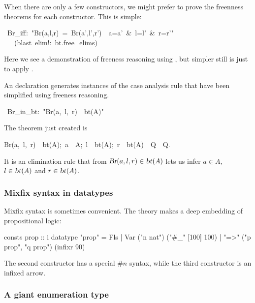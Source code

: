 When there are only a few constructors, we might prefer to prove the freenness
theorems for each constructor.  This is simple:
\begin{isabelle}
\ Br\_iff:\ "Br(a,l,r)\ =\ Br(a',l',r')\ <->\ a=a'\ \&\ l=l'\ \&\ r=r'"\isanewline
\ \ \ (blast\ elim!:\ bt.free\_elims)
\end{isabelle}
Here we see a demonstration of freeness reasoning using
, but simpler still is just to apply .

An  declaration generates instances of the
case analysis rule that have been simplified  using freeness
reasoning. 
\begin{isabelle}
\ Br\_in\_bt:\ "Br(a,\ l,\ r)\ \isasymin \ bt(A)"
\end{isabelle}
The theorem just created is 
\begin{isabelle}
\isasymlbrakk Br(a,\ l,\ r)\ \isasymin \ bt(A);\ \isasymlbrakk a\ \isasymin \ A;\ l\ \isasymin \ bt(A);\ r\ \isasymin \ bt(A)\isasymrbrakk \ \isasymLongrightarrow \ Q\isasymrbrakk \ \isasymLongrightarrow \ Q.
\end{isabelle}
It is an elimination rule that from $\emph{\sl Br}(a,l,r)\in\emph{\sl bt}(A)$
lets us infer $a\in A$, $l\in\emph{\sl bt}(A)$ and
$r\in\emph{\sl bt}(A)$.


\subsubsection{Mixfix syntax in datatypes}

Mixfix syntax is sometimes convenient.  The theory  makes a
deep embedding of propositional logic:
\begin{alltt*}\isastyleminor
consts     prop :: i
datatype  "prop" = Fls
                 | Var ("n \isasymin nat")                ("#_" [100] 100)
                 | "=>" ("p \isasymin prop", "q \isasymin prop")   (infixr 90)
\end{alltt*}
The second constructor has a special $\#n$ syntax, while the third constructor
is an infixed arrow.


\subsubsection{A giant enumeration type}

